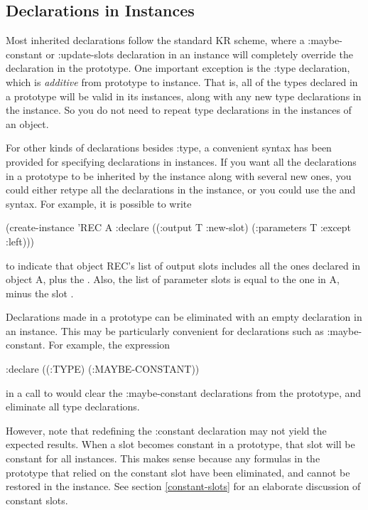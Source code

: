 \subsection{Declarations in Instances}

Most inherited declarations follow the standard KR scheme, where a
{\sc :maybe-constant} or {\sc :update-slots} declaration in an instance
will completely
override the declaration in the prototype.  One important exception is
the {\sc :type} declaration, which is {\it additive} from prototype to
instance.  That is, all of the types declared in a prototype will be
valid in its instances, along with any new type declarations in the
instance.  So you do not need to repeat type declarations in the
instances of an object.

For other kinds of declarations besides {\sc :type}, a convenient syntax has
been provided for specifying declarations in instances.  If you want all the
declarations in a prototype to be inherited by the
instance along with several new ones, you could either retype all the
declarations in the instance, or you could use the  and 
syntax.  For example, it is possible to write
\begin{programexample}
(create-instance 'REC A
  :declare ((:output T :new-slot)
	    (:parameters T :except :left)))
\end{programexample}
to indicate that object REC's list of output slots includes all the
ones declared in object A, plus the .  Also, the list of
parameter slots is equal to the one in A, minus the slot .

\vspace{1 line}
\begin{group}
Declarations made in a prototype can be eliminated with an empty
declaration in an instance.  This may be particularly convenient for
declarations such as {\sc :maybe-constant}.  For example, the expression
\begin{programexample}
  :declare ((:TYPE) (:MAYBE-CONSTANT))
\end{programexample}
in a call to  would clear the {\sc :maybe-constant}
declarations from the prototype, and eliminate all type declarations.
\end{group}
\vspace{1 line}

However, note that redefining the {\sc :constant} declaration may
not yield the expected results.  When a slot becomes constant in a
prototype, that slot will be constant for all instances.  This makes
sense because any formulas in the prototype that relied on the
constant slot have been eliminated, and cannot be restored in the
instance.  See section \ref{constant-slots} for an elaborate
discussion of constant slots.


